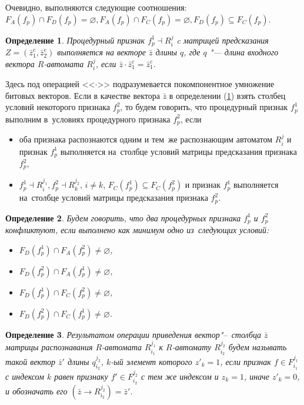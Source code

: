 \documentclass[a4paper, 12pt]{article}
\theoremstyle{break}
\newtheorem{Def}{Определение}
\numberwithin{equation}{section}
\begin{document}
	Очевидно, выполняются следующие соотношения: $F_A(f_p)\cap F_D(f_p)=\varnothing, F_A(f_p)\cap F_C(f_p)=\varnothing, F_D(f_p)\subseteq F_C(f_p)$.

	\begin{Def}\label{def:feas}
		Процедурный признак $f_p^1\dashv R_i^j$ c матрицей предсказания $Z=(\bar z_1^c,\bar z_2^e)$ выполняется на векторе $\bar z$ длины $q$, где $q$ "--- длина входного вектора $R$-автомата $R_i^j$, если $\bar z\cdot \bar z_1^c=\bar z_1^c$.
	\end{Def}
	
	Здесь под операцией <<$\cdot$>> подразумевается покомпонентное умножение битовых векторов. Если в качестве вектора $\bar z$ в определении (\ref{def:feas}) взять столбец условий некоторого признака $f_p^2$, то будем говорить, что процедурный признак $f_p^1$ выполним в~условиях процедурного признака $f_p^2$, если 
	\begin{itemize}
		\item оба признака распознаются одним и тем~же распознающим автоматом $R_i^j$ и признак  $f_p^1$ выполняется на~столбце условий матрицы предсказания признака $f_p^2$,
		\item $f_p^1\dashv R_i^{j_1}, f_p^2\dashv R_k^{j_2}$, $i\not=k$, $F_C(f_p^1 )\subseteq F_C(f_p^2)$ и признак  $f_p^1$ выполняется на~столбце условий матрицы предсказания признака $f_p^2$. 
	\end{itemize}
	
	\begin{Def}
		Будем говорить, что два процедурных признака $f_p^1$ и $f_p^2$ конфликтуют, если выполнено как минимум одно из~следующих условий:
		\begin{itemize}
			\item $F_D(f_p^1)\cap F_A(f_p^2)\not=\varnothing$,
			\item $F_D(f_p^2)\cap F_A(f_p^1)\not=\varnothing$,
			\item $F_D(f_p^1)\cap F_C(f_p^2)\not=\varnothing$,
			\item $F_D(f_p^2)\cap F_C(f_p^1)\not=\varnothing$.
		\end{itemize}
	\end{Def}
	
	\begin{Def}
		Результатом операции приведения вектор"--~столбца $\bar z$ матрицы распознавания $R$-автомата $R_{i_1}^{j_1}$ к $R$-автомату $R_{i_2}^{j_2}$ будем называть такой вектор $\bar z'$ длины $q_{i_2}^{j_2}$, $k$-ый элемент которого $z'_k=1$, если признак $f\in F_{i_1}^{j_1}$ с индексом $k$ равен признаку $f'\in F_{i_2}^{j_2}$ с тем же индексом и $z_k=1$, иначе $z'_k=0$, и обозначать его $(\bar z\rightarrow R_{i_2}^{j_2})=\bar z'$.
	\end{Def}
	
\end{document}
